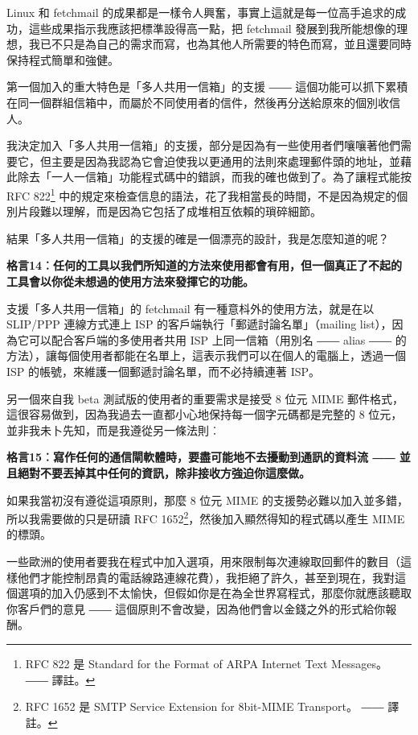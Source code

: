 \documentclass[12pt, a5paper]{book}
\begin{document}
Linux 和 fetchmail
的成果都是一樣令人興奮，事實上這就是每一位高手追求的成功，這些成果指示我應該把標準設得高一點，把
fetchmail
發展到我所能想像的理想，我已不只是為自己的需求而寫，也為其他人所需要的特色而寫，並且還要同時保持程式簡單和強健。

第一個加入的重大特色是「多人共用一信箱」的支援 ――
這個功能可以抓下累積在同一個群組信箱中，而屬於不同使用者的信件，然後再分送給原來的個別收信人。

我決定加入「多人共用一信箱」的支援，部分是因為有一些使用者們嚷嚷著他們需要它，但主要是因為我認為它會迫使我以更通用的法則來處理郵件頭的地址，並藉此除去「一人一信箱」功能程式碼中的錯誤，而我的確也做到了。為了讓程式能按
RFC 822\footnote{RFC 822 是 Standard for the Format of ARPA Internet
  Text Messages。 ―― 譯註。}
中的規定來檢查信息的語法，花了我相當長的時間，不是因為規定的個別片段難以理解，而是因為它包括了成堆相互依賴的瑣碎細節。

結果「多人共用一信箱」的支援的確是一個漂亮的設計，我是怎麼知道的呢？

\textbf{格言14︰任何的工具以我們所知道的方法來使用都會有用，但一個真正了不起的工具會以你從未想過的使用方法來發揮它的功能。}

支援「多人共用一信箱」的 fetchmail 有一種意枓外的使用方法，就是在以
SLIP/PPP 連線方式連上 ISP 的客戶端執行「郵遞討論名單」（mailing
list），因為它可以配合客戶端的多使用者共用 ISP 上同一信箱（用別名 ――
alias ――
的方法），讓每個使用者都能在名單上，這表示我們可以在個人的電腦上，透過一個
ISP 的帳號，來維護一個郵遞討論名單，而不必持續連著 ISP。

另一個來自我 beta 測試版的使用者的重要需求是接受 8 位元 MIME
郵件格式，這很容易做到，因為我過去一直都小心地保持每一個字元碼都是完整的
8 位元，並非我未卜先知，而是我遵從另一條法則︰

\textbf{格言15︰寫作任何的通信閘軟體時，要盡可能地不去擾動到通訊的資料流
―― 並且絕對不要丟掉其中任何的資訊，除非接收方強迫你這麼做。}

如果我當初沒有遵從這項原則，那麼 8 位元 MIME
的支援勢必難以加入並多錯，所以我需要做的只是研讀 RFC 1652\footnote{RFC
  1652 是 SMTP Service Extension for 8bit-MIME Transport。 ―― 譯註。}，然後加入顯然得知的程式碼以產生
MIME 的標頭。

一些歐洲的使用者要我在程式中加入選項，用來限制每次連線取回郵件的數目（這樣他們才能控制昂貴的電話線路連線花費），我拒絕了許久，甚至到現在，我對這個選項的加入仍感到不太愉快，但假如你是在為全世界寫程式，那麼你就應該聽取你客戶們的意見
―― 這個原則不會改變，因為他們會以金錢之外的形式給你報酬。

\newpage
\end{document}
